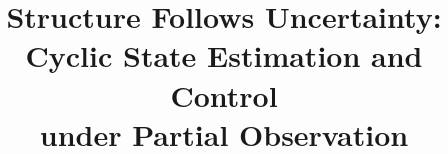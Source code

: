 \documentclass[10pt]{article}
\title{\texorpdfstring{Structure Follows Uncertainty:\\Cyclic State Estimation and Control\\under Partial Observation}{Structure Follows Uncertainty: Cyclic State Estimation and Control under Partial Observation}}
\author{}
\theoremstyle{plain}
\theoremstyle{definition}
\begin{document}
\maketitle

\begin{abstract}

\end{abstract}



\FloatBarrier




\FloatBarrier


\clearpage



\clearpage
\appendix
\raggedbottom
\renewcommand{\thefigure}{S\arabic{figure}}
\renewcommand{\thetable}{S\arabic{table}}
\setcounter{figure}{0}
\setcounter{table}{0}
\renewcommand{\theHfigure}{appendix.\arabic{figure}}
\renewcommand{\theHtable}{appendix.\arabic{table}}







\end{document}
